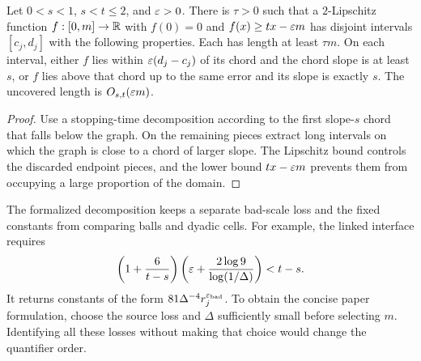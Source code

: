 \begin{lemma}
\label{lem:profile-decomposition}
Let $0<s<1$, $s<t\leq2$, and $\varepsilon>0$. There is $\tau>0$
such that a $2$-Lipschitz function $f:[0,m]\to\mathbb{R}$ with $f(0)=0$
and $f(x)\geq tx-\varepsilon m$ has disjoint intervals $[c_j,d_j]$
with the following properties. Each has length at least $\tau m$.
On each interval, either $f$ lies within $\varepsilon(d_j-c_j)$ of its
chord and the chord slope is at least $s$, or $f$ lies above that
chord up to the same error and its slope is exactly $s$.
The uncovered length is $O_{s,t}(\varepsilon m)$.
\end{lemma}
\begin{proof}
Use a stopping-time decomposition according to the first slope-$s$
chord that falls below the graph. On the remaining pieces extract
long intervals on which the graph is close to a chord of larger
slope. The Lipschitz bound controls the discarded endpoint pieces,
and the lower bound $tx-\varepsilon m$ prevents them from occupying a
large proportion of the domain.
\end{proof}

\begin{remark}
\label{rem:os-losses}
The formalized decomposition keeps a separate bad-scale loss and
the fixed constants from comparing balls and dyadic cells. For
example, the linked interface requires
\[
 \left(1+\frac6{t-s}\right)
 \left(\varepsilon+\frac{2\log9}{\log(1/\Delta)}\right)<t-s.
\]
It returns constants of the form $81\Delta^{-4}r_j^{\varepsilon_{\rm bad}}$.
To obtain the concise paper formulation, choose the source loss and
$\Delta$ sufficiently small before selecting $m$. Identifying
all these losses without making that choice would change the
quantifier order.
\end{remark}
